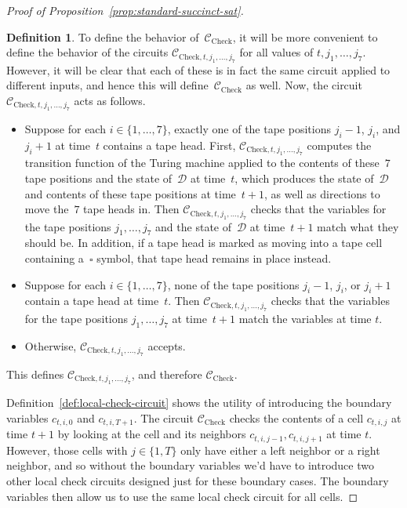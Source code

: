 \documentclass[11pt]{article}
\theoremstyle{definition}
\newtheorem{definition}[theorem]{Definition}
\newcommand{\decider}{\mathcal{D}}
\newcommand{\circuit}{\mathcal{C}}
\begin{document}
\begin{proof}[Proof of Proposition~\ref{prop:standard-succinct-sat}]
\begin{definition}
    To define the behavior of~$\circuit_{\mathrm{Check}}$, it will be more
    convenient to define the behavior of the circuits $\circuit_{\mathrm{Check},
      t, j_1, \ldots, j_7}$ for all values of $t, j_1, \ldots, j_7$.
    However, it will be clear that each of these is in fact the same circuit
    applied to different inputs, and hence this will
    define~$\circuit_{\mathrm{Check}}$ as well.
    Now, the circuit~$\circuit_{\mathrm{Check}, t, j_1, \ldots, j_7}$ acts as
    follows.
    \begin{itemize}
    \item Suppose for each $i \in \{1, \ldots, 7\}$, exactly one of the tape
      positions $j_i-1$, $j_i$, and $j_i+1$ at time~$t$ contains a tape head.
      First, $\circuit_{\mathrm{Check}, t, j_1, \ldots, j_7}$ computes the
      transition function of the Turing machine applied to the contents of
      these~$7$ tape positions and the state of~$\decider$ at time~$t$, which
      produces the state of~$\decider$ and contents of these tape positions at
      time~$t+1$, as well as directions to move the~$7$ tape heads in.
      Then $\circuit_{\mathrm{Check}, t, j_1, \ldots, j_7}$ checks that the
      variables for the tape positions $j_1, \ldots, j_7$ and the state
      of~$\decider$ at time~$t+1$ match what they should be.
      In addition, if a tape head is marked as moving into a tape cell
      containing a~$\square$ symbol, that tape head remains in place instead.
    \item Suppose for each $i \in \{1, \ldots, 7\}$, none of the tape positions
      $j_i -1$, $j_i$, or $j_i+1$ contain a tape head at time~$t$.
      Then $\circuit_{\mathrm{Check}, t, j_1, \ldots, j_7}$ checks that the
      variables for the tape positions $j_1, \ldots, j_7$ at time~$t+1$ match
      the variables at time $t$.
    \item Otherwise, $\circuit_{\mathrm{Check}, t, j_1, \ldots, j_7}$ accepts.
    \end{itemize}
    This defines $\circuit_{\mathrm{Check}, t, j_1, \ldots, j_7}$, and therefore
    $\circuit_{\mathrm{Check}}$.
  \end{definition}

  Definition~\ref{def:local-check-circuit} shows the utility of introducing the
  boundary variables $c_{t, i, 0}$ and $c_{t, i, T+1}$.
  The circuit $\circuit_{\mathrm{Check}}$ checks the contents of a cell $c_{t,
    i, j}$ at time $t+1$ by looking at the cell and its neighbors $c_{t, i,
    j-1}, c_{t, i, j+1}$ at time $t$.
  However, those cells with $j \in \{1, T\}$ only have either a left neighbor or
  a right neighbor, and so without the boundary variables we'd have to introduce
  two other local check circuits designed just for these boundary cases.
  The boundary variables then allow us to use the same local check circuit for
  all cells.


\end{proof}
\end{document}
